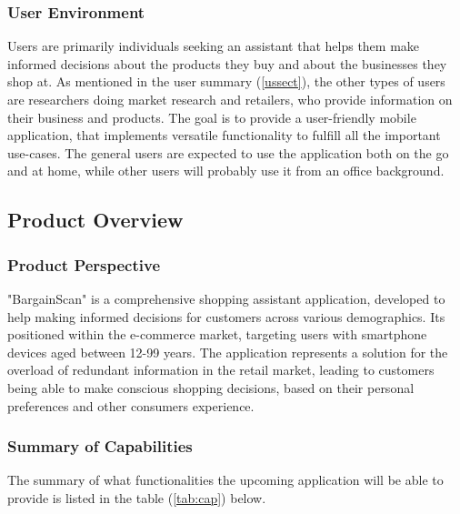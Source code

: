 \subsubsection{User Environment}

Users are primarily individuals seeking an assistant that helps them make informed decisions about the products they buy and about the businesses they shop at. As mentioned in the user summary (\ref{ussect}), the other types of users are researchers doing market research and retailers, who provide information on their business and products. The goal is to provide a user-friendly mobile application, that implements versatile functionality to fulfill all the important use-cases. The general users are expected to use the application both on the go and at home, while other users will probably use it from an office background.

\pagebreak

\subsection{Product Overview} \label{po}

\subsubsection{Product Perspective}

"BargainScan" is a comprehensive shopping assistant application, developed to help making informed decisions for customers across various demographics. Its positioned within the e-commerce market, targeting users with smartphone devices aged between 12-99 years. The application represents a solution for the overload of redundant information in the retail market, leading to customers being able to make conscious shopping decisions, based on their personal preferences and other consumers experience.

\subsubsection{Summary of Capabilities}

The summary of what functionalities the upcoming application will be able to provide is listed in the table (\ref{tab:cap}) below.
 
